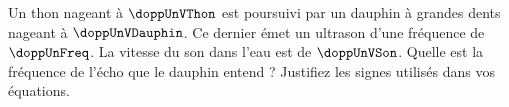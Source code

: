 Un thon nageant à $\doppUnVThon$ est poursuivi par un dauphin à grandes dents nageant à $\doppUnVDauphin$. Ce dernier émet un ultrason d’une fréquence de $\doppUnFreq$. La vitesse du son dans l’eau est de $\doppUnVSon$. Quelle est la fréquence de l’écho que le dauphin entend ? Justifiez les signes utilisés dans vos équations.